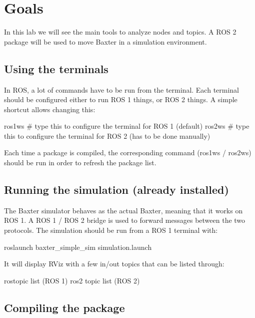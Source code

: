 \documentclass{ecnreport}
\author{O. Kermorgant}
\begin{document}


\section{Goals}

In this lab we will see the main tools to analyze nodes and topics. A ROS 2 package will be used to move Baxter in a simulation environment.

\subsection{Using the terminals}

In ROS, a lot of commands have to be run from the terminal. Each terminal should be configured either to run ROS 1 things, or ROS 2 things.
A simple shortcut allows changing this:
\begin{bashcodelarge}
ros1ws  # type this to configure the terminal for ROS 1 (default)
ros2ws  # type this to configure the terminal for ROS 2 (has to be done manually)
\end{bashcodelarge}

Each time a package is compiled, the corresponding command (ros1ws / ros2ws) should be run in order to refresh the package list.

\subsection{Running the simulation (already installed)}

The Baxter simulator behaves as the actual Baxter, meaning that it works on ROS 1. A ROS 1 / ROS 2 bridge is used to forward messages between the two protocols.
The simulation should be run from a ROS 1 terminal with:
\begin{bashcodelarge}
roslaunch baxter_simple_sim simulation.launch
\end{bashcodelarge}

It will display RViz with a few in/out topics that can be listed through:
\begin{bashcodelarge}
rostopic list (ROS 1)
ros2 topic list (ROS 2)
\end{bashcodelarge}

\subsection{Compiling the package}
\end{document}
